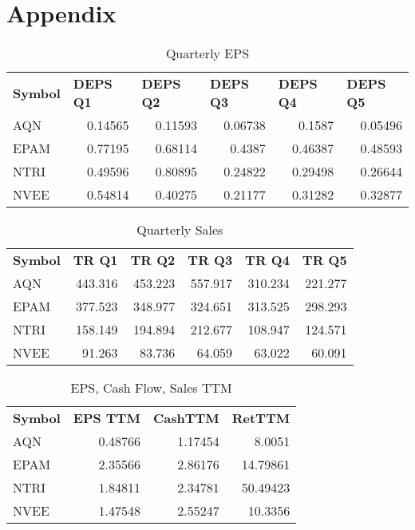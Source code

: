 \documentclass{article}
\begin{document}
\section{Appendix}
\begin{table}[htbp]
  \caption{Quarterly EPS}
   \begin{tabular}{lrrrrr}
    \textbf{Symbol} & \multicolumn{1}{l}{\textbf{DEPS Q1}} & \multicolumn{1}{l}{\textbf{DEPS Q2}} & \multicolumn{1}{l}{\textbf{DEPS Q3}} & \multicolumn{1}{l}{\textbf{DEPS Q4}} & \multicolumn{1}{l}{\textbf{DEPS Q5}} \\
    AQN   & 0.14565 & 0.11593 & 0.06738 & 0.1587 & 0.05496 \\
    EPAM  & 0.77195 & 0.68114 & 0.4387 & 0.46387 & 0.48593 \\
    NTRI  & 0.49596 & 0.80895 & 0.24822 & 0.29498 & 0.26644 \\
    NVEE  & 0.54814 & 0.40275 & 0.21177 & 0.31282 & 0.32877 \\
    \end{tabular}%
  \label{tab:addlabel}%
\end{table}%

\begin{table}[htbp]
  \caption{Quarterly Sales}
    \begin{tabular}{lrrrrr}
    \textbf{Symbol} & \multicolumn{1}{l}{\textbf{TR Q1}} & \multicolumn{1}{l}{\textbf{TR Q2}} & \multicolumn{1}{l}{\textbf{TR Q3}} & \multicolumn{1}{l}{\textbf{TR Q4}} & \multicolumn{1}{l}{\textbf{TR Q5}} \\
    AQN   & 443.316 & 453.223 & 557.917 & 310.234 & 221.277 \\
    EPAM  & 377.523 & 348.977 & 324.651 & 313.525 & 298.293 \\
    NTRI  & 158.149 & 194.894 & 212.677 & 108.947 & 124.571 \\
    NVEE  & 91.263 & 83.736 & 64.059 & 63.022 & 60.091 \\
    \end{tabular}%
  \label{tab:addlabel}%
\end{table}%

\begin{table}[htbp]
  \caption{EPS, Cash Flow, Sales TTM}
   \begin{tabular}{lrrr}
    \textbf{Symbol} & \multicolumn{1}{l}{\textbf{EPS TTM}} & \multicolumn{1}{l}{\textbf{CashTTM}} & \multicolumn{1}{l}{\textbf{RetTTM}} \\
    AQN   & 0.48766 & 1.17454 & 8.0051 \\
    EPAM  & 2.35566 & 2.86176 & 14.79861 \\
    NTRI  & 1.84811 & 2.34781 & 50.49423 \\
    NVEE  & 1.47548 & 2.55247 & 10.3356 \\
    \end{tabular}%
  \label{tab:addlabel}%
\end{table}%
\end{document}
